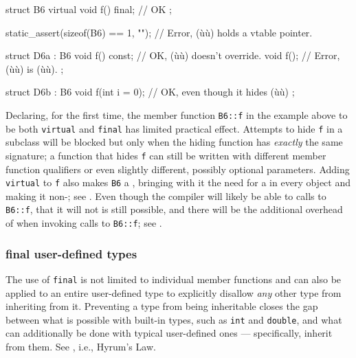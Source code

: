 {{\begin{emcppslisting}[emcppsbatch=e1]
struct B6
{
    virtual void f() final;  // OK
};

static_assert(sizeof(B6) == 1, "");  // Error, (ù{}ù) holds a vtable pointer.

struct D6a : B6
{
    void f() const;     // OK, (ù{}ù) doesn't override.
    void f();           // Error, (ù{}ù) is (ù{}ù).
};

struct D6b : B6
{
    void f(int i = 0);  // OK, even though it hides (ù{}ù)
};
\end{emcppslisting}
    

\noindent Declaring, for the first time, the member function \lstinline!B6::f! in the
example above to be both \lstinline!virtual! and \lstinline!final! has limited
practical effect. Attempts to hide \lstinline!f! in a subclass will be
blocked but only when the hiding function has \emph{exactly} the same
signature; a function that hides \lstinline!f! can still be written with
different member function qualifiers or even slightly different,
possibly optional parameters. Adding \lstinline!virtual! to \lstinline!f! also
makes \lstinline!B6! a , bringing with it the need
for a  in every object and making it
non-; see . Even
though the compiler will likely be able to  calls
to \lstinline!B6::f!, that it will not is still possible, and there will be
the additional overhead of  when invoking calls
to \lstinline!B6::f!; see .

\subsubsection[\lstinline!final! user-defined types]{{\SubsubsecCode final} user-defined types}\label{final-user-defined-types}

The use of \lstinline!final! is not limited to individual member functions
and can also be applied to an entire user-defined type to explicitly
disallow \emph{any} other type from inheriting from it. Preventing a
type from being inheritable closes the gap between what is possible with
built-in types, such as \lstinline!int! and \lstinline!double!, and what can
additionally be done with typical user-defined ones --- specifically,
inherit from them. See , i.e., Hyrum's Law.

}}
